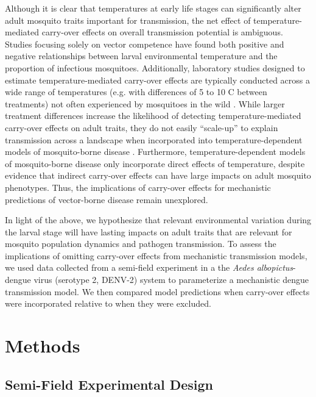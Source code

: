 \documentclass[12pt]{article}
\begin{document}
Although it is clear that temperatures at early life stages can significantly alter adult mosquito traits important for transmission, the net effect of temperature-mediated carry-over effects on overall transmission potential is ambiguous. Studies focusing solely on vector competence have found both positive \citep{muturi2011c} and negative \citep{muturi2011a} relationships between larval environmental temperature and the proportion of infectious mosquitoes. Additionally, laboratory studies designed to estimate temperature-mediated carry-over effects are typically conducted across a wide range of temperatures (e.g. with differences of 5 to 10 \degree C between treatments) not often experienced by mosquitoes in the wild \citep{cator2013}. While larger treatment differences increase the likelihood of detecting temperature-mediated carry-over effects on adult traits, they do not easily ``scale-up'' to explain transmission across a landscape when incorporated into temperature-dependent models of mosquito-borne disease \citep{reiner2013}. Furthermore, temperature-dependent models of mosquito-borne disease only incorporate direct effects of temperature, despite evidence that indirect carry-over effects can have large impacts on adult mosquito phenotypes. Thus, the implications of carry-over effects for mechanistic predictions of vector-borne disease remain unexplored.

In light of the above, we hypothesize that relevant environmental variation during the larval stage will have lasting impacts on adult traits that are relevant for mosquito population dynamics and pathogen transmission. To assess the implications of omitting carry-over effects from mechanistic transmission models, we used data collected from a semi-field experiment in a the \textit{Aedes albopictus}-dengue virus (serotype 2, DENV-2) system to parameterize a mechanistic dengue transmission model. We then compared model predictions when carry-over effects were incorporated relative to when they were excluded.

\section{Methods}
\subsection{Semi-Field Experimental Design}
\end{document}
